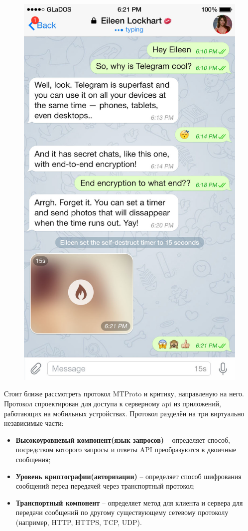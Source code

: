 \begin{figure}[h]
\begin{minipage}{.5\textwidth}
  \label{sec:analysis:research:analogs:telegram:dialogues}
\end{minipage}%
\begin{minipage}{.5\textwidth}
  \centering
  \includegraphics[width=.8\linewidth]{inc/img/tg-secretchat.jpg}
  \label{sec:analysis:research:analogs:telegram:secretchat}
\end{minipage}
\end{figure}

Стоит ближе рассмотреть протокол MTProto и критику, направленую на него. Протокол спроектирован для доступа к серверному \gls{api} из приложений, работающих на мобильных устройствах. 
Протокол разделён на три виртуально независимые части: 
\begin{itemize}
	\item \textbf{Высокоуровневый компонент(язык запросов)} -- определяет способ, посредством которого запросы и ответы API преобразуются в двоичные сообщения;
	\item \textbf{Уровень криптографии(авторизации)} -- определяет способ шифрования сообщений перед передачей через транспортный протокол;
	\item \textbf{Транспортный компонент} -- определяет метод для клиента и сервера для передачи сообщений по другому существующему сетевому протоколу (например, HTTP, HTTPS, TCP, UDP).
\end{itemize}

